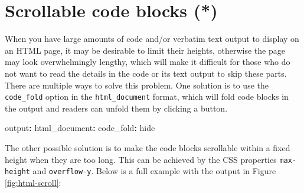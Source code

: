 \documentclass[
  11pt,
]{krantz}
\newenvironment{Shaded}{\begin{snugshade}}{\end{snugshade}}
\newcommand{\AttributeTok}[1]{\textcolor[rgb]{0.61,0.61,0.61}{#1}}
\newcommand{\FunctionTok}[1]{\textcolor[rgb]{0,0,0}{#1}}
\newcommand{\KeywordTok}[1]{\textcolor[rgb]{0.27,0.27,0.27}{\textbf{#1}}}
\begin{document}
\hypertarget{html-scroll}{%
\section{Scrollable code blocks (*)}\label{html-scroll}}

When you have large amounts of code and/or verbatim text output to display on an HTML page, it may be desirable to limit their heights, otherwise the page may look overwhelmingly lengthy, which will make it difficult for those who do not want to read the details in the code or its text output to skip these parts. There are multiple ways to solve this problem. One solution is to use the \texttt{code\_fold} option in the \texttt{html\_document} format, which will fold code blocks in the output and readers can unfold them by clicking a button.

\begin{Shaded}
\begin{Highlighting}[]
\FunctionTok{output}\KeywordTok{:}
\AttributeTok{  }\FunctionTok{html_document}\KeywordTok{:}
\AttributeTok{    }\FunctionTok{code_fold}\KeywordTok{:}\AttributeTok{ hide}
\end{Highlighting}
\end{Shaded}

The other possible solution is to make the code blocks scrollable within a fixed height when they are too long. This can be achieved by the CSS properties \texttt{max-height} and \texttt{overflow-y}. Below is a full example with the output in Figure \ref{fig:html-scroll}:
\end{document}
